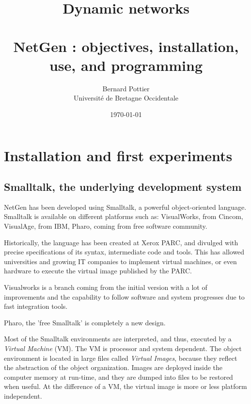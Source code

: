 \documentclass[times]{book}
\title{  \Huge Dynamic networks\\~\\
\huge NetGen : objectives, installation, use, 
and programming }
\author{ Bernard Pottier\\
Universit\'e de Bretagne Occidentale }
\date{\today}
\begin{document}
\maketitle




\chapter{Installation and first experiments}

\section { Smalltalk, the underlying development system}

NetGen has been developed using Smalltalk, a powerful object-oriented language. Smalltalk is available 
on different platforms such as: VisualWorks, from Cincom, VisualAge, from IBM, Pharo, coming from
free software community.

Historically, the language has been created at Xerox PARC, and divulged with precise specifications of
its syntax, intermediate code and tools. This has allowed universities and growing IT companies to
implement virtual machines, or even hardware to execute the virtual image published by the PARC.

Visualworks is a branch coming from the initial version with a lot of improvements and the capability
to follow software and system progresses due to fast integration tools. 

Pharo, the 'free Smalltalk'  is completely a new design.
 
Most of the Smalltalk environments are interpreted, and thus, executed by a {\sl Virtual Machine} (VM).
The VM is processor and system dependent. The object environment is located in large files 
called {\sl Virtual Images}, because they reflect the abstraction of the object organization.
Images are deployed inside the computer memory at run-time, and they are dumped into files
to be restored when useful.  At the difference of a VM, the virtual image is more or less 
platform independent.
\end{document}

